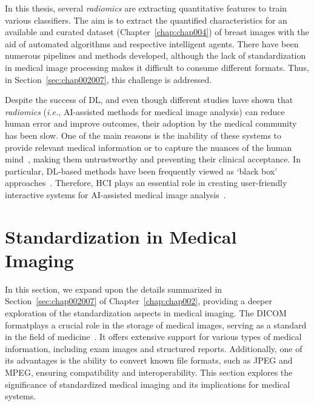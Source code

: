 In this thesis, several {\it radiomics} are extracting quantitative features to train various classifiers.
The aim is to extract the quantified characteristics for an available and curated dataset (Chapter~\ref{chap:chap004}) of breast images with the aid of automated algorithms and respective intelligent agents.
There have been numerous pipelines and methods developed, although the lack of standardization in medical image processing makes it difficult to consume different formats.
Thus, in Section~\ref{sec:chap002007}, this challenge is addressed.

Despite the success of \ac{DL}, and even though different studies have shown that {\it radiomics} ({\it i.e.}, \ac{AI}-assisted methods for medical image analysis) can reduce human error and improve outcomes, their adoption by the medical community has been slow.
One of the main reasons is the inability of these systems to provide relevant medical information or to capture the nuances of the human mind~\cite{kohli2018cad, 10.1145/2858036.2858373}, making them untrustworthy and preventing their clinical acceptance.
In particular, \ac{DL}-based methods have been frequently viewed as `black box' approaches~\cite{litjens2017survey}.
Therefore, \ac{HCI} plays an essential role in creating user-friendly interactive systems for \ac{AI}-assisted medical image analysis~\cite{10.1145/3132272.3134111}.

\section{Standardization in Medical Imaging}
\label{sec:app001007}

In this section, we expand upon the details summarized in Section~\ref{sec:chap002007} of Chapter~\ref{chap:chap002}, providing a deeper exploration of the standardization aspects in medical imaging.
The \ac{DICOM} format\footnotemark[17] plays a crucial role in the storage of medical images, serving as a standard in the field of medicine~\cite{Trivedi2019}.
It offers extensive support for various types of medical information, including exam images and structured reports.
Additionally, one of its advantages is the ability to convert known file formats, such as \ac{JPEG} and \ac{MPEG}, ensuring compatibility and interoperability.
This section explores the significance of standardized medical imaging and its implications for medical systems.


